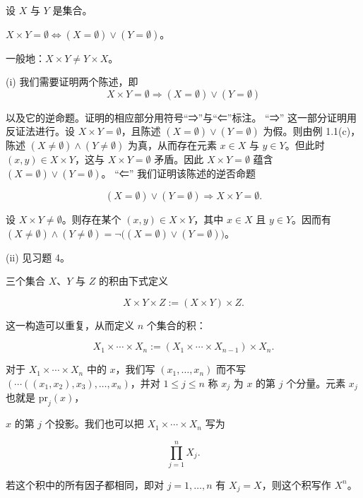 \begin{proposition}

设 $X$ 与 $Y$ 是集合。

\begin{subitems}
\item

$ X \times Y = \emptyset \Leftrightarrow (X = \emptyset) \lor (Y = \emptyset) $。

\item

一般地：$ X \times Y \neq Y \times X $。

\proofhead
(i) 我们需要证明两个陈述，即
\[
X\times Y=\emptyset\Rightarrow(X=\emptyset)\lor(Y=\emptyset)
\]

以及它的逆命题。证明的相应部分用符号“⇒”与“⇐”标注。
“⇒” 这一部分证明用反证法进行。设 $ X \times Y = \emptyset $，且陈述 $ (X = \emptyset) \lor (Y = \emptyset) $ 为假。则由例 1.1(c)，陈述 $ (X \neq \emptyset) \land (Y \neq \emptyset) $ 为真，从而存在元素 $ x \in X $ 与 $ y \in Y $。但此时 $ (x, y) \in X \times Y $，这与 $ X \times Y = \emptyset $ 矛盾。因此 $ X \times Y = \emptyset $ 蕴含 $ (X = \emptyset) \lor (Y = \emptyset) $。
“⇐” 我们证明该陈述的逆否命题

\[
(X=\emptyset)\lor(Y=\emptyset)\Rightarrow X\times Y=\emptyset.
\]

设 $ X \times Y \neq \emptyset $。则存在某个 $ (x, y) \in X \times Y $，其中 $ x \in X $ 且 $ y \in Y $。因而有 $ (X \neq \emptyset) \land (Y \neq \emptyset) = \neg\big((X = \emptyset) \lor (Y = \emptyset)\big) $。

\end{subitems}

(ii) 见习题 4。

三个集合 $X$、$Y$ 与 $Z$ 的积由下式定义

\[
X\times Y\times Z:=(X\times Y)\times Z.
\]

这一构造可以重复，从而定义 $n$ 个集合的积：

\[
X_{1}\times\cdots\times X_{n}:=\left(X_{1}\times\cdots\times X_{n-1}\right)\times X_{n}.
\]

对于 $ X_1 \times \cdots \times X_n $ 中的 $ x $，我们写 $ (x_1, \ldots, x_n) $ 而不写 $ \left( \cdots ((x_1, x_2), x_3), \ldots, x_n \right) $，并对 $ 1 \leq j \leq n $ 称 $ x_j $ 为 $ x $ 的第 $ j $ 个分量。元素 $ x_j $ 也就是 $ \text{pr}_j(x) $，

$ x $ 的第 $ j $ 个投影。我们也可以把 $ X_1 \times \cdots \times X_n $ 写为

\[
\prod_{j=1}^{n} X_{j}.
\]

若这个积中的所有因子都相同，即对 $j = 1, \ldots, n$ 有 $X_j = X$，则这个积写作 $X^n$。

\end{proposition}

